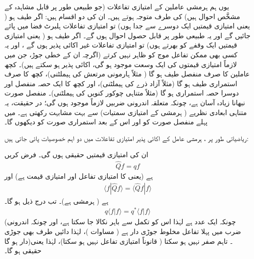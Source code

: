 یوں ہم ہرمشی عاملین کے امتیازی تفاعلات  (جو طبیعی طور پر قابل مشاہدہ کے مشخَّص احوال ہیں) کی طرف متوجہ ہوتے ہیں۔ ان کی  دو اقسام ہیں: اگر طیف  ہو ( یعنی امتیازی قیمتیں ایک دوسرے سے جدا  ہوں)   تو  امتیازی تفاعلات ہلبرٹ فضا میں پائے جائیں گے اور یہ طبیعی طور پر قابل حصول احوال ہوں گے۔ اگر طیف  ہو ( یعنی امتیازی قیمتیں ایک  وقفے  کو بھرتے ہوں) تو  امتیازی تفاعلات  غیر اکائی پذیر  ہوں گے ، اور یہ کسی بھی ممکن  تفاعل موج کو ظاہر نہیں کرتے (اگرچہ ان کے خطی جوڑ، جن میں لازماً امتیازی قیمتوں  کی ایک وسعت موجود ہو گی، اکائی پذیر ہو سکتے ہیں)۔ کچھ عاملین کا صرف منفصل طیف ہو گا ( مثلاً ہارمونی مرتعش کی ہیملٹنی)، کچھ کا صرف استمراری طیف ہو گا (مثلاً آزاد ذرے کی ہیملٹنی)، اور کچھ کا ایک حصہ منفصل اور دوسرا حصہ استمراری ہو گا (مثلاً متناہی چوکور کنویں کی ہیملٹنی)۔  منفصل صورت نبھانا زیادہ آسان ہے،  چونکہ  متعلقہ اندرونی ضربیں  لازماً موجود ہوں گی؛ در حقیقت،  یہ متناہی ابعادی نظریے ( ہرمشی  کے امتیازی سمتیات) سے بہت مشابہت رکھتی  ہے۔ میں پہلے منفصل صورت کو اور اس کے بعد استمراری صورت کو دیکھوں گا۔ 

ریاضیاتی طور پر ، ہرمشی عامل کے اکائی پذیر امتیازی تفاعلات  میں دو اہم خصوصیات پائی جاتی ہیں:
 
ان کی امتیازی قیمتیں حقیقی ہوں گی۔ 
 فرض کریں
\begin{align*}
\hat{Q}f = qf 
\end{align*}
ہے (یعنی  کا امتیازی تفاعل  اور امتیازی قیمت  ہے) اور 
\begin{align*}
\langle f | \hat{Q} f \rangle = \langle \hat{Q} f | f \rangle
\end{align*}
ہے  ( ہرمشی ہے)۔ تب درج ذیل ہو گا۔
\begin{align*}
q\langle f \left\vert f \right. \rangle = q^{*} \langle f \left\vert f \right. \rangle
\end{align*}
(چونکہ   ایک عدد ہے لہٰذا اس کو تکمل سے باہر نکالا جا سکتا ہے، اور چونکہ اندرونی ضرب میں پہلا تفاعل مخلوط جوڑی دار ہے ( مساوات  )،  لہٰذا دائیں طرف  بھی جوڑی دار ہو گا)۔ تاہم  صفر نہیں ہو سکتا  ( قانوناً   امتیازی تفاعل نہیں ہو سکتا)،  لہٰذا   یعنی  حقیقی ہو گا۔

